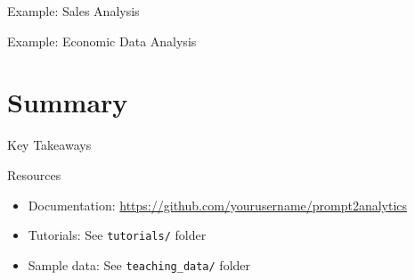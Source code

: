 \documentclass[aspectratio=169]{beamer}
\begin{document}
\begin{frame}{Example: Sales Analysis}
\end{frame}

\begin{frame}{Example: Economic Data Analysis}
\end{frame}

\section{Summary}

\begin{frame}{Key Takeaways}
\end{frame}

\begin{frame}{Resources}
    \begin{itemize}
        \item Documentation: \url{https://github.com/yourusername/prompt2analytics}
        \item Tutorials: See \texttt{tutorials/} folder
        \item Sample data: See \texttt{teaching\_data/} folder
    \end{itemize}
\end{frame}
\end{document}

